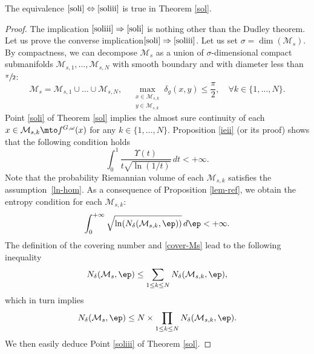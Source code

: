 \begin{prop}\label{ieii2}
The equivalence $\eqref{soli}\Leftrightarrow\eqref{soliii}$ is true in Theorem \ref{sol}.
\end{prop}
\begin{proof}
The implication $\eqref{soliii}\Rightarrow\eqref{soli}$ is nothing other than the Dudley theorem.
Let us prove the converse implication$\eqref{soli}\Rightarrow\eqref{soliii}$. Let us set $\sigma=\dim(\mathcal{M}_s)$. By compactness, we can decompose $\mathcal{M}_s$ as a union of $\sigma$-dimensional compact submanifolds $\mathcal{M}_{s,1},\dots,\mathcal{M}_{s,N}$ with smooth boundary and with diameter less than $\sfrac{\pi}{2}$:
\begin{equation}\label{cover-Ms}
\mathcal{M}_s=\mathcal{M}_{s,1}\cup \dots \cup \mathcal{M}_{s,N}, \quad \max_{\substack{x\in \mathcal{M}_{s,k}\\ y\in \mathcal{M}_{s,k}}} \delta_g(x,y)\leq \frac{\pi}{2}, \quad \forall k\in \{1,\dots,N\}.
\end{equation}
Point \eqref{soli} of Theorem \ref{sol} implies the almost sure continuity of each $x\in \mathcal{M}_{s,k}\mto f^{G,\omega}(x)$ for any $k\in \{1,\dots,N\}$.
Proposition \ref{ieii} (or its proof) shows that the following condition holds
\begin{equation*}
\int_{0}^1 \frac{\Upsilon(t)}{t\sqrt{\ln(1/t)}}\,dt<+\infty.
\end{equation*}
Note that the probability Riemannian volume of each $\mathcal{M}_{s,k}$ satisfies the assumption~\eqref{ln-hom}.
As a consequence of Proposition \ref{lem-ref}, we obtain the entropy condition for each $\mathcal{M}_{s,k}$:
\begin{equation*}
\int_{0}^{+\infty} \sqrt{\ln(N_{\delta} (\mathcal{M}_{s,k},\ep))}\,d\ep <+\infty.
\end{equation*}
The definition of the covering number and \eqref{cover-Ms} lead to the following inequality
\begin{equation}\label{min-NN}
N_{\delta}(\mathcal{M}_s,\ep) \leq \sum_{1\leq k\leq N}N_{\delta}(\mathcal{M}_{s,k},\ep),
\end{equation}
which in turn implies
\begin{equation}\label{min-NN2}
N_{\delta}(\mathcal{M}_{s},\ep) \leq N\times \prod_{1\leq k\leq N}N_{\delta}(\mathcal{M}_{s,k} ,\ep).
\end{equation}
We then easily deduce Point \eqref{soliii} of Theorem \ref{sol}.
\end{proof}

